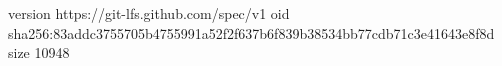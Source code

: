 version https://git-lfs.github.com/spec/v1
oid sha256:83addc3755705b4755991a52f2f637b6f839b38534bb77cdb71c3e41643e8f8d
size 10948
